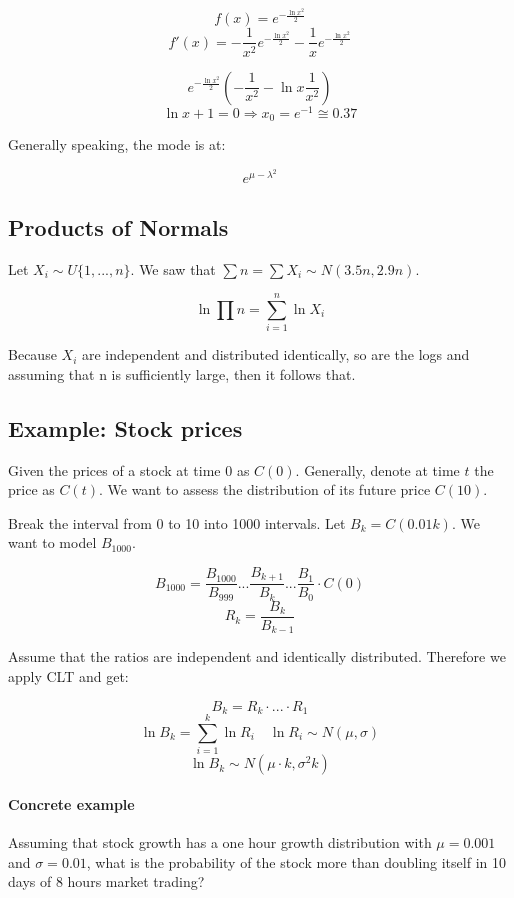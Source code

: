 \documentclass[a4paper]{article}
\begin{document}
\[f(x)=e^{-\frac{\ln x^2}{2}}\]
\[f'(x)=-\frac{1}{x^2}e^{-\frac{\ln x^2}{2}} - \frac{1}{x}e^{-\frac{\ln x^2}{2}}\]


\[e^{-\frac{\ln x^2}{2}} \left( -\frac{1}{x^2}-\ln x \frac{1}{x^2} \right)\]
\[\ln x + 1 = 0 \Rightarrow x_0=e^{-1}\cong 0.37 \]

Generally speaking, the mode is at:

\[e^{\mu - \lambda^2}\]

\subsection{Products of Normals}

Let $X_i \sim U\{1,...,n\}$. We saw that $\sum n=\sum X_i \sim N(3.5n, 2.9n)$.

\[\ln \prod n=\sum_{i=1}^{n} \ln X_i\]

Because $X_i$ are independent and distributed identically, so are the logs and assuming that n is sufficiently large, then it follows that.


\subsection{Example: Stock prices}
Given the prices of a stock at time 0 as $C(0)$. Generally, denote at time $t$ the price as $C(t)$. We want to assess the distribution of its future price $C(10)$.

Break the interval from 0 to 10 into 1000 intervals. Let $B_k=C(0.01k)$. We want to model $B_{1000}$.

\[B_{1000}=\frac{B_{1000}}{B_{999}}...\frac{B_{k+1}}{B_{k}}...\frac{B_1}{B_0} \cdot C(0)\]
\[ R_k=\frac{B_k}{B_{k-1}} \]

Assume that the ratios are independent and identically distributed. Therefore we apply CLT and get:

\[B_k=R_k\cdot...\cdot R_1\]
\[\ln B_k=\sum_{i=1}^{k} \ln R_i \quad \ln R_i \sim N(\mu, \sigma)\]
\[\ln B_k \sim N(\mu\cdot k, \sigma^2 k)\]

\paragraph{Concrete example}
Assuming that stock growth has a one hour growth distribution with $\mu=0.001$ and $\sigma=0.01$, what is the probability of the stock more than doubling itself in 10 days of 8 hours market trading?
\end{document}

